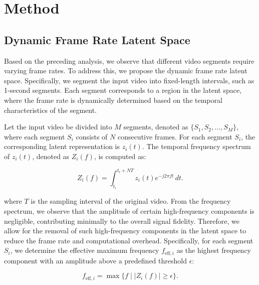 
\section{Method}

\subsection{Dynamic Frame Rate Latent Space}



Based on the preceding analysis, we observe that different video segments require varying frame rates. To address this, we propose the dynamic frame rate latent space. Specifically, we segment the input video into fixed-length intervals, such as 1-second segments. Each segment corresponds to a region in the latent space, where the frame rate is dynamically determined based on the temporal characteristics of the segment.

Let the input video be divided into \( M \) segments, denoted as \( \{S_1, S_2, \dots, S_M\} \), where each segment \( S_i \) consists of \( N \) consecutive frames. For each segment \( S_i \), the corresponding latent representation is \( z_i(t) \). The temporal frequency spectrum of \( z_i(t) \), denoted as \( Z_i(f) \), is computed as:

\[
Z_i(f) = \int_{t_i}^{t_i + N T} z_i(t) e^{-j 2 \pi f t} \, dt.
\]

where \( T \) is the sampling interval of the original video. From the frequency spectrum, we observe that the amplitude of certain high-frequency components is negligible, contributing minimally to the overall signal fidelity. Therefore, we allow for the removal of such high-frequency components in the latent space to reduce the frame rate and computational overhead. Specifically, for each segment \( S_i \), we determine the effective maximum frequency \( f_{\text{eff}, i} \) as the highest frequency component with an amplitude above a predefined threshold \( \epsilon \):

\[
f_{\text{eff}, i} = \max \{ f \mid |Z_i(f)| \geq \epsilon \}.
\]

